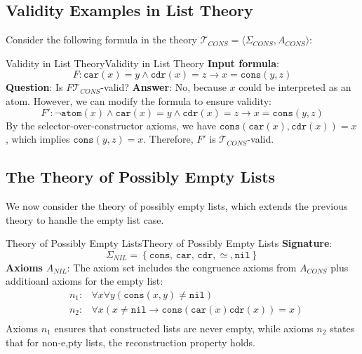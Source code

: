 \documentclass[a4paper]{article}
\theoremstyle{definition}
\begin{document}
\subsection{Validity Examples in List Theory}
Consider the following formula in the theory \( \mathcal{T}_{CONS} = \langle \Sigma_{CONS}, A_{CONS} \rangle \):
\begin{example}{Validity in List Theory}{Validity in List Theory}
\textbf{Input formula}:
\[
  F: \texttt{car}(x) = y \wedge \texttt{cdr}(x) = z \rightarrow x = \texttt{cons}(y,z)
\]
\textbf{Question}: Is \( F \mathcal{T}_{CONS} \)-valid?
\vspace{1em}
\noindent
\newline
\textbf{Answer}: No, because \( x \) could be interpreted as an atom.
\vspace{1em}
\noindent
\newline
However, we can modify the formula to ensure validity:
\[
	F' : \lnot \texttt{atom}(x) \wedge \texttt{car}(x) = y \wedge \texttt{cdr}(x) = z \rightarrow x = \texttt{cons}(y,z)
\]
By the selector-over-constructor axioms, we have \( \texttt{cons}(\texttt{car}(x),\texttt{cdr}(x)) = x \), which implies 
\( \texttt{cons}(y,z) = x \). Therefore, \( F' \) is \( \mathcal{T}_{CONS} \)-valid.
\end{example}
\subsection{The Theory of Possibly Empty Lists}
We now consider the theory of possibly empty lists, which extends the previous theory to handle the empty list case.
\begin{definition}{Theory of Possibly Empty Lists}{Theory of Possibly Empty Lists}
\textbf{Signature}:
\[
  \Sigma_{NIL} = \left\{ \texttt{cons, car, cdr}, \simeq, \texttt{nil} \right\}
\]
\textbf{Axioms} \( A_{NIL} \):
\vspace{1em}
\noindent
\newline
The axiom set includes the congruence axioms from \( A_{CONS} \) plus additioanl axioms for the empty list:
\begin{align*}
	& n_1 : & \forall x \forall y (\texttt{cons}(x,y) \neq \texttt{nil})\\
	& n_2 : & \forall x (x \neq \texttt{nil} \rightarrow \texttt{cons}(\texttt{car}(x)\texttt{cdr}(x)) = x) \\
\end{align*}
Axioms \( n_1 \) ensures that constructed lists are never empty, while axioms \( n_2 \) states that for non-e,pty lists, the 
reconstruction property holds.
\end{definition}
\end{document}

